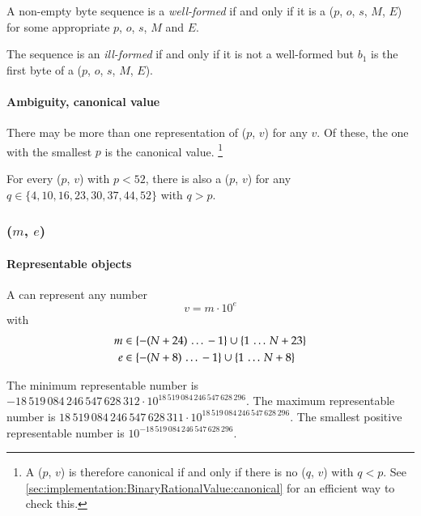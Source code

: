 A non-empty byte sequence  is a \emph{well-formed}
\DborBinaryRationalValue{} if and only if
it is a \DborBinaryRationalToken*($p$, $o$, $s$, $M$, $E$) for some appropriate $p$, $o$, $s$, $M$ and $E$.

The sequence is an \emph{ill-formed} \DborBinaryRationalValue{} if and only if it is not a well-formed
\DborBinaryRationalValue{} but $b_1$ is the first byte of a
\DborBinaryRationalToken*($p$, $o$, $s$, $M$, $E$).

\paragraph{Ambiguity, canonical value}

There may be more than one representation of \DborBinaryRationalValue($p$, $v$) for any $v$.
Of these, the one with the smallest $p$ is the canonical value.%
\footnote{
    A \DborBinaryRationalValue($p$, $v$) is therefore canonical if and only if there is
    no \DborBinaryRationalValue($q$, $v$) with $q < p$.
    See \ref{sec:implementation:BinaryRationalValue:canonical} for an efficient way to check this.
}

For every \DborBinaryRationalValue($p$, $v$) with $p < 52$, there is also
a \DborBinaryRationalValue($p$, $v$) for any
$q \in \{4, 10, 16, 23, 30, 37, 44, 52\}$ with $q > p$.


\subsubsection{\DborDecimalRationalValue($m$, $e$)}
\hypertarget{sec:def:DecimalRationalValue}{}

\paragraph{Representable objects}

A \DborDecimalRationalValue{} can represent any number
\begin{equation}
    v = m \cdot 10^e
\end{equation}
with
\begin{align*}
    m & \in \{-(N + 24) \,\ldots\, -1\} \cup \{1 \,\ldots\, N + 23\} \\
    e & \in \{-(N + 8) \,\ldots\, -1\} \cup \{1 \,\ldots\, N + 8\}
\end{align*}

\smallskip
The minimum representable number is $-18\,519\,084\,246\,547\,628\,312 \cdot 10^{18\,519\,084\,246\,547\,628\,296}$.
The maximum representable number is $18\,519\,084\,246\,547\,628\,311 \cdot 10^{18\,519\,084\,246\,547\,628\,296}$.
The smallest positive representable number is $10^{-18\,519\,084\,246\,547\,628\,296}$.

